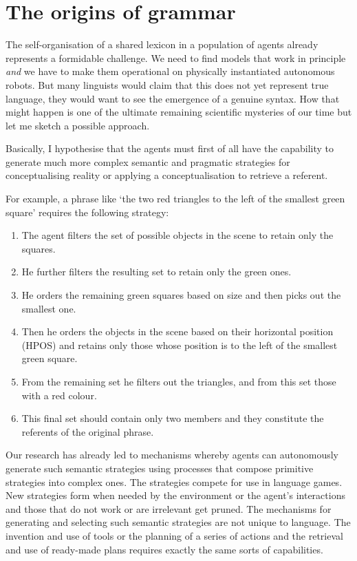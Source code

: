 \section{The origins of grammar}

The self-organisation of a shared lexicon in a population
of agents already represents a formidable challenge.
We need to find models that work in principle {\itshape and} 
we have to make them operational on physically 
instantiated autonomous robots. 
But many linguists would claim that this does not yet 
represent true language, they would want to see the 
emergence of a genuine syntax. How that might
happen is one of the ultimate remaining scientific
mysteries of our time but let me sketch a possible approach. 

Basically, I hypothesise that the agents must 
first of all have the capability to generate much 
more complex semantic and pragmatic strategies for conceptualising
reality or applying a conceptualisation to retrieve 
a referent.

For example, a phrase like `the two red
triangles to the left of the smallest green square' requires
the following strategy: 
\begin{enumerate}
\item The agent filters the set of possible objects in 
the scene to retain only the squares. 
\item He further filters the resulting set to retain only 
the green ones. 
\item He orders the remaining green squares based on 
size and then picks out the smallest one. 
\item Then he orders the objects in the scene based on 
their horizontal position (HPOS) and retains only those
whose position is to the left of the smallest green square. 
\item From the remaining set he filters out the triangles, 
and from this set those with a red colour. 
\item This final set should contain only two members
and they constitute the referents of the original phrase. 
\end{enumerate}
Our research has already led to  
mechanisms whereby agents can autonomously generate such
semantic strategies using processes that compose
primitive strategies into complex ones. The
strategies compete for use in language games. 
New strategies form when needed by the environment or 
the agent's interactions and those that do not work or 
are irrelevant get pruned. The mechanisms for generating 
and selecting such semantic strategies are not unique
to language. The invention and use of tools or the 
planning of a series of actions and the retrieval 
and use of ready-made plans requires exactly the 
same sorts of capabilities. 


